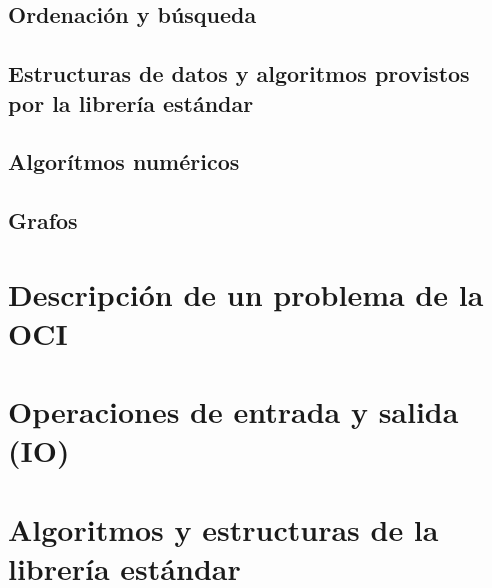 \documentclass{article}
\begin{document}
\subsection{Ordenación y búsqueda}


\subsection{Estructuras de datos y algoritmos provistos por la librería estándar}


\subsection{Algorítmos numéricos}


\subsection{Grafos}


\newpage
\appendix
\section{Descripción de un problema de la OCI}
\label{problem-description}


\section{Operaciones de entrada y salida (IO)}
\label{tech-IO}


\section{Algoritmos y estructuras de la librería estándar}

\end{document}
